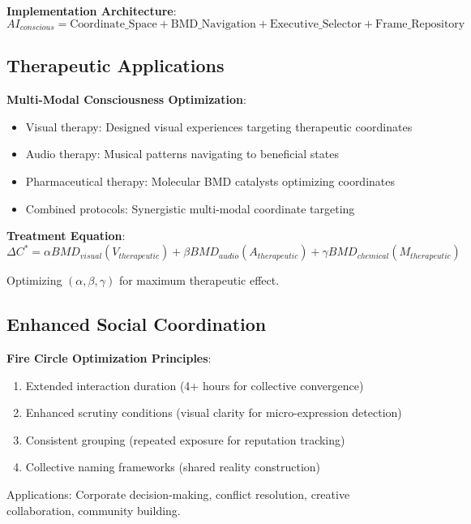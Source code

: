 \documentclass[12pt]{article}
\theoremstyle{definition}
\theoremstyle{remark}
\begin{document}
\textbf{Implementation Architecture}:
\begin{equation}
AI_{conscious} = \text{Coordinate\_Space} + \text{BMD\_Navigation} + \text{Executive\_Selector} + \text{Frame\_Repository}
\end{equation}

\subsection{Therapeutic Applications}

\textbf{Multi-Modal Consciousness Optimization}:
\begin{itemize}
\item Visual therapy: Designed visual experiences targeting therapeutic coordinates
\item Audio therapy: Musical patterns navigating to beneficial states
\item Pharmaceutical therapy: Molecular BMD catalysts optimizing coordinates
\item Combined protocols: Synergistic multi-modal coordinate targeting
\end{itemize}

\textbf{Treatment Equation}:
\begin{equation}
\Delta C^* = \alpha BMD_{visual}(V_{therapeutic}) + \beta BMD_{audio}(A_{therapeutic}) + \gamma BMD_{chemical}(M_{therapeutic})
\end{equation}

Optimizing $(\alpha, \beta, \gamma)$ for maximum therapeutic effect.

\subsection{Enhanced Social Coordination}

\textbf{Fire Circle Optimization Principles}:
\begin{enumerate}
\item Extended interaction duration (4+ hours for collective convergence)
\item Enhanced scrutiny conditions (visual clarity for micro-expression detection)
\item Consistent grouping (repeated exposure for reputation tracking)
\item Collective naming frameworks (shared reality construction)
\end{enumerate}

Applications: Corporate decision-making, conflict resolution, creative collaboration, community building.
\end{document}
